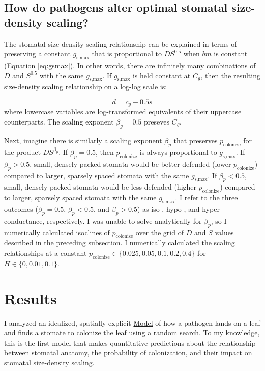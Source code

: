 \documentclass[utf8]{frontiersSCNS}
\newcommand{\gsmax}{$g_\text{s,max}$}
\begin{document}
\hypertarget{how-do-pathogens-alter-optimal-stomatal-size-density-scaling}{%
\subsection*{How do pathogens alter optimal stomatal size-density
scaling?}\label{how-do-pathogens-alter-optimal-stomatal-size-density-scaling}}

The stomatal size-density scaling relationship can be explained in terms
of preserving a constant \gsmax{} that is proportional to
\(D S ^ {0.5}\) when \(bm\) is constant (Equation \ref{eq:gsmax}). In
other words, there are infinitely many combinations of \(D\) and
\(S ^ {0.5}\) with the same \gsmax. If \gsmax{} is held constant at
\(C_g\), then the resulting size-density scaling relationship on a
log-log scale is:

\[ d = c_g - 0.5 s \] where lowercase variables are log-transformed
equivalents of their uppercase counterparts. The scaling exponent
\(\beta_g = 0.5\) preseves \(C_g\).

Next, imagine there is similarly a scaling exponent \(\beta_p\) that
preserves \(p_\text{colonize}\) for the product \(D S^{\beta_p}\). If
\(\beta_p = 0.5\), then \(p_\text{colonize}\) is always proportional to
\gsmax. If \(\beta_p > 0.5\), small, densely packed stomata would be
better defended (lower \(p_\text{colonize}\)) compared to larger,
sparsely spaced stomata with the same \gsmax. If \(\beta_p < 0.5\),
small, densely packed stomata would be less defended (higher
\(p_\text{colonize}\)) compared to larger, sparsely spaced stomata with
the same \gsmax. I refer to the three outcomes (\(\beta_p = 0.5\),
\(\beta_p < 0.5\), and \(\beta_p > 0.5\)) as iso-, hypo-, and
hyper-conductance, respectively. I was unable to solve analytically for
\(\beta_p\), so I numerically calculated isoclines of
\(p_\text{colonize}\) over the grid of \(D\) and \(S\) values described
in the preceding subsection. I numerically calculated the scaling
relationships at a constant
\(p_\text{colonize} \in \{0.025, 0.05, 0.1, 0.2, 0.4\}\) for
\(H \in \{0, 0.01, 0.1\}\).

\hypertarget{results}{%
\section*{Results}\label{results}}

I analyzed an idealized, spatially explicit
\protect\hyperlink{model}{Model} of how a pathogen lands on a leaf and
finds a stomate to colonize the leaf using a random search. To my
knowledge, this is the first model that makes quantitative predictions
about the relationship between stomatal anatomy, the probability of
colonization, and their impact on stomatal size-density scaling.
\end{document}
